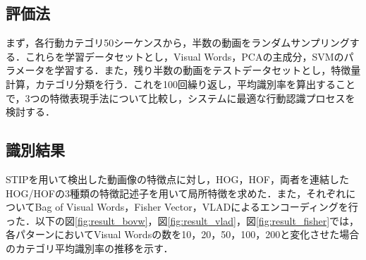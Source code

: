 \subsection{評価法}
まず，各行動カテゴリ50シーケンスから，半数の動画をランダムサンプリングする．これらを学習データセットとし，Visual Words，PCAの主成分，SVMのパラメータを学習する．また，残り半数の動画をテストデータセットとし，特徴量計算，カテゴリ分類を行う．これを100回繰り返し，平均識別率を算出することで，3つの特徴表現手法について比較し，システムに最適な行動認識プロセスを検討する．

\subsection{識別結果}
STIPを用いて検出した動画像の特徴点に対し，HOG，HOF，両者を連結したHOG/HOFの3種類の特徴記述子を用いて局所特徴を求めた．また，それぞれについてBag of Visual Words，Fisher Vector，VLADによるエンコーディングを行った．以下の図{\ref{fig:result_bovw}}，図{\ref{fig:result_vlad}}，図{\ref{fig:result_fisher}}では，各パターンにおいてVisual Wordsの数を10，20，50，100，200と変化させた場合のカテゴリ平均識別率の推移を示す．

